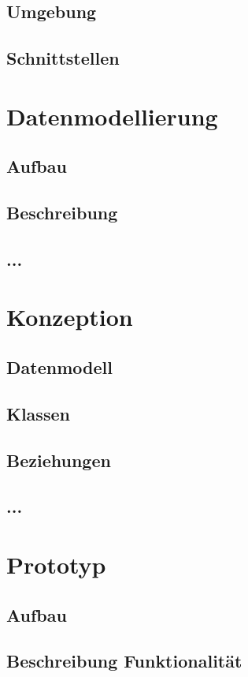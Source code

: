 \documentclass[12pt, titlepage]{article}
\begin{document}
\subsection{Umgebung}
\subsection{Schnittstellen}

\newpage
\section{Datenmodellierung}
\subsection{Aufbau}
\subsection{Beschreibung }
\subsection{...}

\newpage
\section{Konzeption}
\subsection{Datenmodell}
\subsection{Klassen}
\subsection{Beziehungen}
\subsection{...}

\newpage
\section{Prototyp}
\subsection{Aufbau}
\subsection{Beschreibung Funktionalität}
\end{document}
